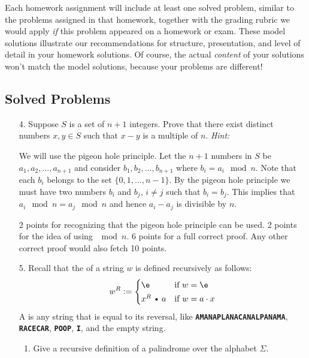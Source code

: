 \documentclass[11pt]{article}
\def\Cdot{\mathbin{\text{\normalfont \textbullet}}}
\def\Sym#1{\textbf{\texttt{\color{BrickRed}#1}}}
\begin{document}
\begin{boxquote}{0.95}
  Each homework assignment will include at least one solved problem,
  similar to the problems assigned in that homework, together with the
  grading rubric we would apply \emph{if} this problem appeared on a
  homework or exam.  These model solutions illustrate our
  recommendations for structure, presentation, and level of detail in
  your homework solutions.  Of course, the actual \emph{content} of
  your solutions won’t match the model solutions, because your
  problems are different!
\end{boxquote}

\subsection*{Solved Problems}
\begin{enumerate}
\item[4.] Suppose $S$ is a set of $n+1$ 
    integers.  Prove that there exist distinct numbers $x,y \in S$
    such that $x-y$ is a multiple of $n$. {\em Hint:} 

    \begin{solution}
      We will use the pigeon hole principle. Let the $n+1$ numbers in $S$
      be $a_1,a_2,\ldots,a_{n+1}$ and consider $b_1,b_2,\ldots,b_{n+1}$ where
      $b_i = a_i \mod n$. Note that each $b_i$ belongs to the
      set $\{0,1,\ldots,n-1\}$. By the pigeon hole principle we must have
      two numbers $b_i$ and $b_j$, $i \neq j$ such that $b_i = b_j$.
      This implies that $a_i \mod n = a_j \mod n$ and hence $a_i - a_j$ is
      divisible  by $n$.

      \begin{rubric}
        2 points for recognizing that the pigeon hole principle can be
        used. 2 points for the idea of using $\mod n$. 6 points for a
        full correct proof. Any other correct proof would also fetch 10 points.
\end{rubric}

    \end{solution}

\item[5.]
Recall that the  of a string $w$ is defined recursively as follows:
\[	
	w^R := \begin{cases}
		\e & \text{if $w=\e$} \\[0.5ex]
		x^R \Cdot a & \text{if $w=a\cdot x$}
	\end{cases}
\]
A  is any string that is equal to its reversal, like \Sym{AMANAPLANACANALPANAMA}, \hbox{\Sym{RACECAR}}, \Sym{POOP}, \Sym{I}, and the empty string.
\begin{enumerate}
\item
Give a recursive definition of a palindrome over the alphabet $\Sigma$.


\end{enumerate}
\end{enumerate}
\end{document}
